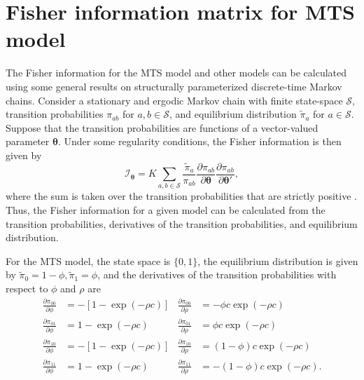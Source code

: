 \documentclass[man, noextraspace, floatsintext]{apa6}\usepackage[]{graphicx}\usepackage[]{color}
\newcommand{\bibfile}{C:/Users/jep2963/Documents/Bibliography/Behavioral_observation-APP}
\newcommand{\info}{\mathcal{I}}
\begin{document}


 
\appendix
\section{Fisher information matrix for MTS model}
\label{app:MTS_derivation}

The Fisher information for the MTS model and other models can be calculated using some general results on structurally parameterized discrete-time Markov chains. Consider a stationary and ergodic Markov chain with finite state-space $\mathcal{S}$, transition probabilities $\pi_{ab}$ for $a,b \in \mathcal{S}$, and equilibrium distribution $\tilde\pi_a$ for $a \in \mathcal{S}$. Suppose that the transition probabilities are functions of a vector-valued parameter $\boldsymbol\theta$. Under some regularity conditions, the Fisher information is then given by
\begin{equation}
\label{eq:Fisher_Info}
\mathbf{\info}_{\boldsymbol\theta} = K \sum_{a,b \in \mathcal{S}} \frac{\tilde\pi_a}{\pi_{ab}}\frac{\partial \pi_{ab}}{\partial \boldsymbol\theta}\frac{\partial \pi_{ab}}{\partial \boldsymbol\theta'},
\end{equation}
where the sum is taken over the transition probabilities that are strictly positive \citet{Billingsley1961statistical}.
Thus, the Fisher information for a given model can be calculated from the transition 
probabilities, derivatives of the transition probabilities, and equilibrium distribution.

For the MTS model, the state space is $\{0,1\}$, the equilibrium distribution is given by $\tilde\pi_0 = 1 - \phi, \tilde\pi_1 = \phi$, and the derivatives of the transition probabilities with respect to $\phi$ and $\rho$ are 
\begin{align*}
\frac{\partial \pi_{00}}{\partial \phi} &= -\left[1 - \exp(-\rho c)\right] 
& \frac{\partial \pi_{00}}{\partial \rho} &= -\phi c \exp(-\rho c) \\
\frac{\partial \pi_{01}}{\partial \phi} &= 1 - \exp(-\rho c) 
& \frac{\partial \pi_{01}}{\partial \rho} &= \phi c \exp(-\rho c) \\
\frac{\partial \pi_{10}}{\partial \phi} &= -\left[1 - \exp(-\rho c)\right]
& \frac{\partial \pi_{10}}{\partial \rho} &= \left(1 - \phi\right) c \exp(-\rho c) \\
\frac{\partial \pi_{11}}{\partial \phi} &= 1 - \exp(-\rho c)
& \frac{\partial \pi_{11}}{\partial \rho} &= -\left(1 - \phi\right) c \exp(-\rho c).
\end{align*}
\end{document}

